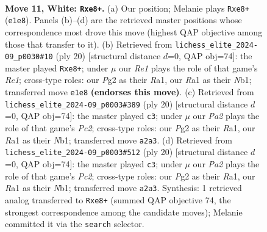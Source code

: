\documentclass[11pt]{article}
\begin{document}
\begin{figure}[p]\centering
\begin{subfigure}{0.46\textwidth}\centering
\resizebox{\linewidth}{!}{%
\newchessgame
\chessboard[
  setfen={r1bqr1k1/pppp1ppp/3n1b2/8/3P4/8/PPP2PPP/RNBQRBK1 w - - 3 11},
  showmover=false,
  pgfstyle=straightmove, color=movearrow, markmove={e1-e8}
]}
\caption{}
\end{subfigure}\hfill
\begin{subfigure}{0.46\textwidth}\centering
\resizebox{\linewidth}{!}{%
\newchessgame
\chessboard[
  setfen={r1bqr1k1/pppp1ppp/3n1b2/8/3P4/8/PPP2PPP/RNBQRBK1 w - - 3 11},
  showmover=false,
  pgfstyle=straightmove, color=movearrow, markmove={e1-e8}
]}
\caption{}
\end{subfigure}
\\[4pt]
\begin{subfigure}{0.46\textwidth}\centering
\resizebox{\linewidth}{!}{%
\newchessgame
\chessboard[
  setfen={r1bqr1k1/pppp1ppp/3n1b2/8/3P4/8/PPP2PPP/RNBQRBK1 w - - 3 11},
  showmover=false,
  pgfstyle=straightmove, color=movearrow, markmove={c2-c3}
]}
\caption{}
\end{subfigure}\hfill
\begin{subfigure}{0.46\textwidth}\centering
\resizebox{\linewidth}{!}{%
\newchessgame
\chessboard[
  setfen={r1bqr1k1/pppp1ppp/3n1b2/8/3P4/8/PPP2PPP/RNBQRBK1 w - - 3 11},
  showmover=false,
  pgfstyle=straightmove, color=movearrow, markmove={c2-c3}
]}
\caption{}
\end{subfigure}
\caption{\textbf{Move 11, White: \texttt{Rxe8+}.} (a) Our position; Melanie plays \texttt{Rxe8+} (\texttt{e1e8}). Panels (b)--(d) are the retrieved master positions whose correspondence most drove this move (highest QAP objective among those that transfer to it). (b) Retrieved from \texttt{lichess\_elite\_2024-09\_p0030\#10} (ply 20) [structural distance $d$=0, QAP obj=74]: the master played \texttt{Rxe8+}; under $\mu$ our \emph{Re1} plays the role of that game's \emph{Re1}; cross-type roles: our \emph{P}g2 as their \emph{R}a1, our \emph{R}a1 as their \emph{N}b1; transferred move \texttt{e1e8} \textbf{(endorses this move)}. (c) Retrieved from \texttt{lichess\_elite\_2024-09\_p0003\#389} (ply 20) [structural distance $d$=0, QAP obj=74]: the master played \texttt{c3}; under $\mu$ our \emph{Pa2} plays the role of that game's \emph{Pc2}; cross-type roles: our \emph{P}g2 as their \emph{R}a1, our \emph{R}a1 as their \emph{N}b1; transferred move \texttt{a2a3}. (d) Retrieved from \texttt{lichess\_elite\_2024-09\_p0003\#512} (ply 20) [structural distance $d$=0, QAP obj=74]: the master played \texttt{c3}; under $\mu$ our \emph{Pa2} plays the role of that game's \emph{Pc2}; cross-type roles: our \emph{P}g2 as their \emph{R}a1, our \emph{R}a1 as their \emph{N}b1; transferred move \texttt{a2a3}. Synthesis: 1 retrieved analog transferred to \texttt{Rxe8+} (summed QAP objective 74, the strongest correspondence among the candidate moves); Melanie committed it via the \texttt{search} selector.}
\label{fig:thought-m20}
\end{figure}
\end{document}
